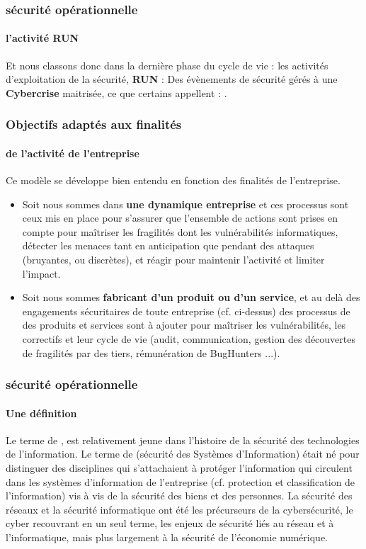 \begin{frame}
\frametitle<presentation>{sécurité opérationnelle}
\framesubtitle<presentation>{l'activité RUN}

Et nous classons donc dans la dernière phase du cycle de vie : les activités d'exploitation de la sécurité, \textbf{RUN} : Des évènements de sécurité gérés à une \textbf{Cybercrise} maitrisée, ce que certains appellent \textbf{} : .
\end{frame}


\begin{frame}
\frametitle<presentation>{Objectifs adaptés aux finalités}
\framesubtitle<presentation>{de l'activité de l'entreprise}
Ce modèle se développe bien entendu en fonction des finalités de l'entreprise.

\begin{itemize}
    \item Soit nous sommes dans \textbf{une dynamique entreprise} et ces processus sont ceux mis en place pour s'assurer que  l'ensemble de actions sont prises en compte pour maîtriser les fragilités dont les vulnérabilités informatiques, détecter les menaces tant en anticipation que pendant des attaques (bruyantes, ou discrètes), et réagir pour maintenir l'activité et limiter l'impact.
    \item  Soit nous sommes \textbf{fabricant d'un produit ou d'un service}, et au delà des engagements sécuritaires de toute entreprise (cf. ci-dessus) des processus de  des produits et services sont à ajouter pour maîtriser les vulnérabilités, les correctifs et leur cycle de vie  (audit, communication, gestion des découvertes de fragilités par des tiers, rémunération de BugHunters ...).
\end{itemize}
\end{frame}

\begin{frame}
\frametitle<presentation>{sécurité opérationnelle}
\framesubtitle<presentation>{Une définition}
 Le terme de , est relativement jeune dans l’histoire de la sécurité des technologies de l’information. Le terme de (sécurité des Systèmes d’Information) était né pour distinguer des disciplines qui s’attachaient à protéger l’information qui circulent dans les systèmes d'information de l’entreprise (cf. protection et classification de l’information) vis à vis de la sécurité des biens et des personnes. La sécurité des réseaux et la sécurité informatique ont été les précurseurs de la cybersécurité, le cyber recouvrant en un seul terme, les enjeux de sécurité liés au réseau et à l’informatique, mais plus largement à la sécurité de l'économie numérique.
\end{frame}

